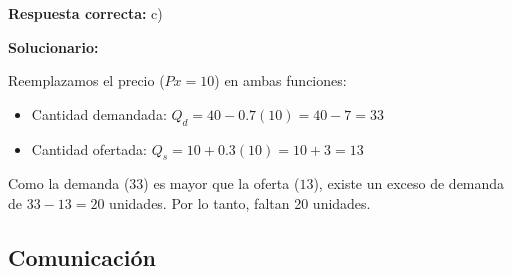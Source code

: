 \begin{enumerate}[resume]
\textbf{Respuesta correcta:} c)

\vspace{2mm}
\textbf{Solucionario:}

Reemplazamos el precio ($Px = 10$) en ambas funciones:
\begin{itemize}
	\item Cantidad demandada: $Q_d = 40 - 0.7(10) = 40 - 7 = 33$
	\item Cantidad ofertada: $Q_s = 10 + 0.3(10) = 10 + 3 = 13$
\end{itemize}
Como la demanda ($33$) es mayor que la oferta ($13$), existe un exceso de demanda de $33 - 13 = 20$ unidades. Por lo tanto, faltan 20 unidades.


\vspace{6mm}

\end{enumerate}



\subsection*{Comunicación}

